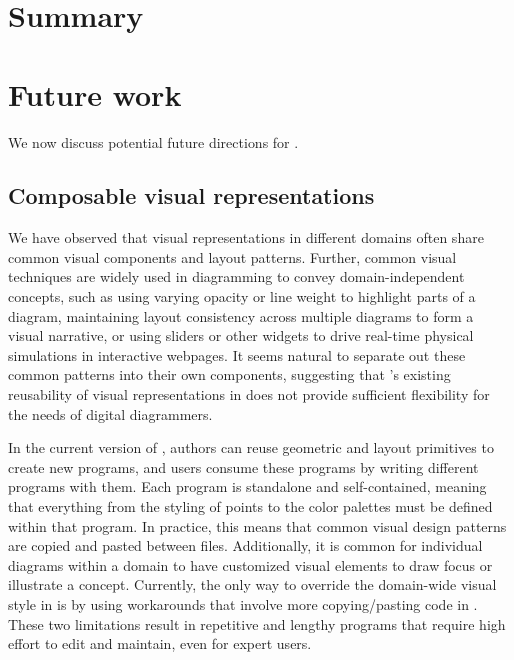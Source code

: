 \section{Summary}
\section{Future work}

We now discuss potential future directions for \Edgeworth. 

\subsection{Composable visual representations}

We have observed that visual representations in different domains often share common visual components and layout patterns. Further, common visual techniques are widely used in diagramming to convey domain-independent concepts, such as using varying opacity or line weight to highlight parts of a diagram, maintaining layout consistency across multiple diagrams to form a visual narrative, or using sliders or other widgets to drive real-time physical simulations in interactive webpages. It seems natural to separate out these common patterns into their own components, suggesting that \Penrose's existing reusability of visual representations in \Style{} does not provide sufficient flexibility for the needs of digital diagrammers.

In the current version of \Penrose{}, authors can reuse geometric and layout primitives to create new \Style{} programs, and users consume these programs by writing different \Substance{} programs with them. Each \Style{} program is standalone and self-contained, meaning that everything from the styling of points to the color palettes must be defined within that program. In practice, this means that common visual design patterns are copied and pasted between \Style{} files. Additionally, it is common for individual diagrams within a domain to have customized visual elements to draw focus or illustrate a concept. Currently, the only way to override the domain-wide visual style in \Penrose{} is by using workarounds that involve more copying/pasting code in \Style{}. These two limitations result in repetitive and lengthy programs that require high effort to edit and maintain, even for expert \Penrose{} users.

